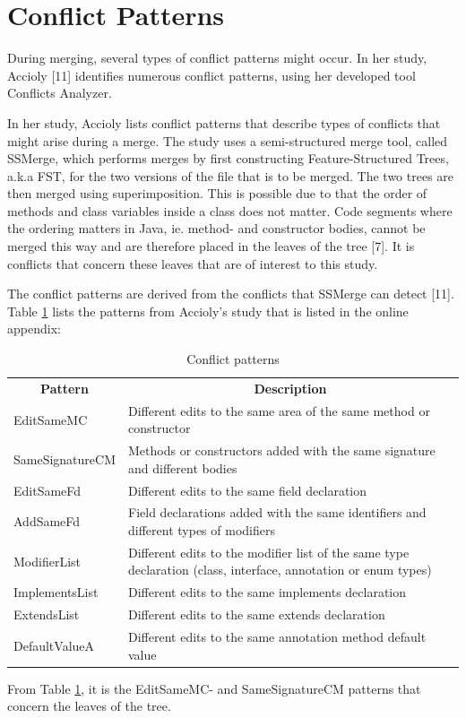 \section{Conflict Patterns}
During merging, several types of conflict patterns might occur. In her study, Accioly [11] identifies numerous conflict patterns, using her developed tool Conflicts Analyzer.

In her study, Accioly lists conflict patterns that describe types of conflicts that might arise during a merge. The study uses a semi-structured merge tool, called SSMerge, which performs merges by first constructing Feature-Structured Trees, a.k.a FST, for the two versions of the file that is to be merged. The two trees are then merged using superimposition. This is possible due to that the order of methods and class variables inside a class does not matter. Code segments where the ordering matters in Java, ie. method- and constructor bodies, cannot be merged this way and are therefore placed in the leaves of the tree [7]. It is conflicts that concern these leaves that are of interest to this study.

The conflict patterns are derived from the conflicts that SSMerge can detect [11]. Table \ref{table:conflictpatterns} lists the patterns from Accioly’s study that is listed in the online appendix:\\%
\begin{table}
\caption{Conflict patterns}\label{table:conflictpatterns}
\begin{tabular}{| l | p{10cm} |}
\hline
\multicolumn{1}{c}{\textbf{Pattern}} & \multicolumn{1}{c}{\textbf{Description}}\\
EditSameMC & Different edits to the same area of the same method or constructor\\
SameSignatureCM & Methods or constructors added with the same signature and different bodies\\
EditSameFd & Different edits to the same field declaration\\
AddSameFd & Field declarations added with the same identifiers and different types of modifiers\\
ModifierList & Different edits to the modifier list of the same type declaration (class, interface, annotation or enum types)\\
ImplementsList & Different edits to the same implements declaration\\
ExtendsList & Different edits to the same extends declaration\\
DefaultValueA & Different edits to the same annotation method default value
\end{tabular}
\end{table}
From Table \ref{table:conflictpatterns}, it is the EditSameMC- and SameSignatureCM patterns that concern the leaves of the tree.


